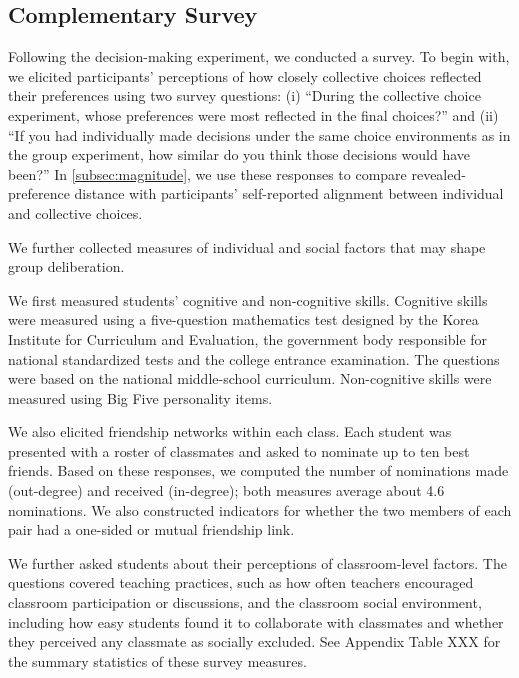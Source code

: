 \documentclass[11 pt]{article}
\begin{document}

\subsection{Complementary Survey}
\label{subsec:complementary_survey}

Following the decision-making experiment, we conducted a survey. To begin with, we elicited participants' perceptions of how closely collective choices reflected their preferences using two survey questions: (i) ``During the collective choice experiment, whose preferences were most reflected in the final choices?'' and (ii) ``If you had individually made decisions under the same choice environments as in the group experiment, how similar do you think those decisions would have been?'' In \autoref{subsec:magnitude}, we use these responses to compare revealed-preference distance with participants' self-reported alignment between individual and collective choices.

We further collected measures of individual and social factors that may shape group deliberation.

We first measured students' cognitive and non-cognitive skills. Cognitive skills were measured using a five-question mathematics test designed by the Korea Institute for Curriculum and Evaluation, the government body responsible for national standardized tests and the college entrance examination. The questions were based on the national middle-school curriculum. %
Non-cognitive skills were measured using Big Five personality items.

We also elicited friendship networks within each class. Each student was presented with a roster of classmates and asked to nominate up to ten best friends. Based on these responses, we computed the number of nominations made (out-degree) and received (in-degree); both measures average about 4.6 nominations. We also constructed indicators for whether the two members of each pair had a one-sided or mutual friendship link.%

We further asked students about their perceptions of classroom-level factors. The questions covered teaching practices, such as how often teachers encouraged classroom participation or discussions, and the classroom social environment, including how easy students found it to collaborate with classmates and whether they perceived any classmate as socially excluded. See  Appendix Table XXX for the summary statistics of these survey measures. 
\end{document}
